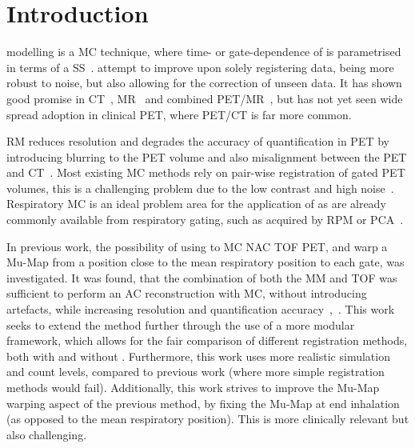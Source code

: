 
\section{Introduction} \label{sec:introduction}
     modelling is a \gls{MC} technique, where time- or gate-dependence of  is parametrised in terms of a \gls{SS}~\cite{McClelland2013}.  attempt to improve upon solely registering data, being more robust to noise, but also allowing for the correction of unseen data. It has shown good promise in \gls{CT}~\cite{Li2007EnhancedModel}, \gls{MR}~\cite{Manke2002RespiratoryModels}
    and  combined \gls{PET}/\gls{MR}~\cite{Manber2016JointCorrection.}, but has not yet seen wide spread adoption in clinical \gls{PET}, where \gls{PET}/\gls{CT} is far more common.
    
    \gls{RM} reduces resolution and degrades the accuracy of quantification in \gls{PET} by introducing blurring to the \gls{PET} volume and also misalignment between the \gls{PET} and \gls{CT}~\cite{Nehmeh2008a}. Most existing \gls{MC} methods rely on pair-wise registration of gated \gls{PET} volumes, this is a challenging problem due to the low contrast and high noise~\cite{Oliveira2014}. Respiratory \gls{MC} is an ideal problem area for the application of  as  are already commonly available from respiratory gating, such as acquired by \gls{RPM} or \gls{PCA}~\cite{Thielemans2011}.
    
    In previous work, the possibility of using  to \gls{MC} \gls{NAC} \gls{TOF} \gls{PET}, and warp a \gls{Mu-Map} from a position close to the mean respiratory position to each gate, was investigated. It was found, that the combination of both the \gls{MM} and \gls{TOF} was sufficient to perform an \gls{AC} reconstruction with \gls{MC}, without introducing artefacts, while increasing resolution and quantification accuracy~\cite{Whitehead2019ImpactPET},~\cite{Whitehead2020PET/CTFields}. This work seeks to extend the method further through the use of a more modular framework, which allows for the fair comparison of different registration methods, both with and without . Furthermore, this work uses more realistic simulation and count levels, compared to previous work (where more simple registration methods would fail). Additionally, this work strives to improve the \gls{Mu-Map} warping aspect of the previous method, by fixing the \gls{Mu-Map} at end inhalation (as opposed to the mean respiratory position). This is more clinically relevant but also challenging.
    
